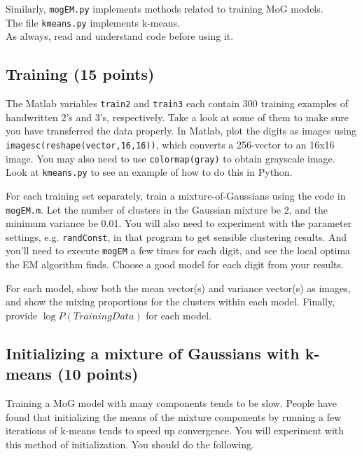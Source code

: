 \documentclass[12pt]{article}
\begin{document}
Similarly, {\tt mogEM.py} implements methods related to training MoG models.\\
The file {\tt kmeans.py} implements k-means.\\

As always, read and understand code before using it.

\subsection{Training (15 points)}

\label{sec:training}



The Matlab variables {\tt train2} and {\tt train3} each contain 300 training
examples of handwritten 2's and 3's, respectively.
Take a look at some of them to make sure you have transferred the data properly.
In Matlab, plot the digits as images using {\tt imagesc(reshape(vector,16,16))}, which converts a
256-vector to an 16x16 image.  You may also need to use {\tt colormap(gray)} to obtain grayscale image.
Look at {\tt kmeans.py} to see an example of how to do this in Python.


For each training set separately, train a mixture-of-Gaussians using the code in {\tt
mogEM.m}. Let the number of clusters in the Gaussian mixture be 2, and the
minimum variance be 0.01. You will also need to experiment with the
parameter settings, e.g. {\tt randConst}, in that program to get sensible clustering results.
And you'll need to execute {\tt mogEM} a few times for each digit, and see the local
optima the EM algorithm finds. Choose a good model for each digit from your
results.



For each model, show both the mean vector(s) and variance vector(s) as
images, and show the mixing proportions for the clusters within each model.
Finally, provide $\log P(Training Data)$ for each model.


\subsection{Initializing a mixture of Gaussians with k-means (10 points)}

Training a MoG model with many components tends to be slow.  People have found that
initializing the means of the mixture components by running a few iterations of k-means
tends to speed up convergence. You will experiment with this method of initialization.
You should do the following.
\end{document}
